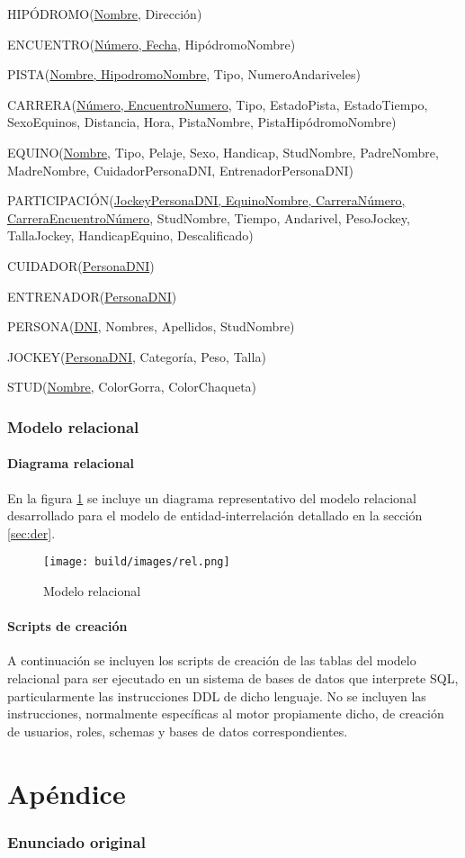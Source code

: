 \documentclass[a4paper,11pt]{article}
\begin{document}
HIPÓDROMO(\uline{Nombre}, Dirección)

ENCUENTRO(\uline{Número, Fecha}, HipódromoNombre)

PISTA(\uline{Nombre, HipodromoNombre}, Tipo, NumeroAndariveles)

CARRERA(\uline{Número, EncuentroNumero}, Tipo, EstadoPista, EstadoTiempo, SexoEquinos, Distancia, Hora, PistaNombre, PistaHipódromoNombre)

EQUINO(\uline{Nombre}, Tipo, Pelaje, Sexo, Handicap, StudNombre, PadreNombre, MadreNombre, CuidadorPersonaDNI, EntrenadorPersonaDNI)

PARTICIPACIÓN(\uline{JockeyPersonaDNI, EquinoNombre, CarreraNúmero, CarreraEncuentroNúmero}, StudNombre, Tiempo, Andarivel, PesoJockey, TallaJockey, HandicapEquino, Descalificado)

CUIDADOR(\uline{PersonaDNI})

ENTRENADOR(\uline{PersonaDNI})

PERSONA(\uline{DNI}, Nombres, Apellidos, StudNombre)

JOCKEY(\uline{PersonaDNI}, Categoría, Peso, Talla)

STUD(\uline{Nombre}, ColorGorra, ColorChaqueta)


\section{Modelo relacional}

\subsection{Diagrama relacional}

En la figura \ref{fig:relacional} se incluye un diagrama representativo del
modelo relacional desarrollado para el modelo de entidad-interrelación
detallado en la sección \ref{sec:der}.

\begin{figure}[h!t]
  \centering
  \texttt{[image: build/images/rel.png]}
  \caption{Modelo relacional} \label{fig:relacional}
\end{figure}

\FloatBarrier

\subsection{Scripts de creación}

A continuación se incluyen los scripts de creación de las tablas del modelo
relacional para ser ejecutado en un sistema de bases de datos que interprete
SQL, particularmente las instrucciones DDL de dicho lenguaje. No se incluyen
las instrucciones, normalmente específicas al motor propiamente dicho, de
creación de usuarios, roles, schemas y bases de datos correspondientes.



\clearpage

\part{Apéndice}
\appendix

\section{Enunciado original}\label{sec:enunciado}

\end{document}
